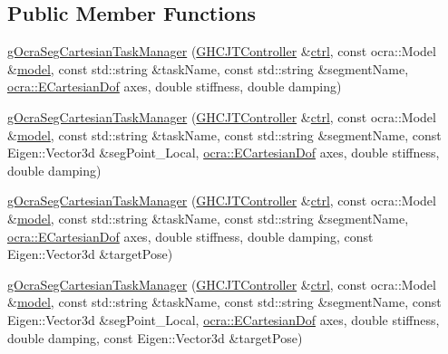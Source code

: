 \subsection*{Public Member Functions}
\begin{DoxyCompactItemize}
\item 
\hyperlink{classgocra_1_1gOcraSegCartesianTaskManager_adea9d716dfc3751b4ce088e8f5617fcd}{g\+Ocra\+Seg\+Cartesian\+Task\+Manager} (\hyperlink{classgocra_1_1GHCJTController}{G\+H\+C\+J\+T\+Controller} \&\hyperlink{classgocra_1_1gOcraTaskManagerBase_a52d76d9b54d92f3d31faeaafda99e4c7}{ctrl}, const ocra\+::\+Model \&\hyperlink{classgocra_1_1gOcraTaskManagerBase_adc439e7170f7120611fc6d009d06404e}{model}, const std\+::string \&task\+Name, const std\+::string \&segment\+Name, \hyperlink{namespaceocra_a436781c7059a0f76027df1c652126260}{ocra\+::\+E\+Cartesian\+Dof} axes, double stiffness, double damping)
\item 
\hyperlink{classgocra_1_1gOcraSegCartesianTaskManager_a33e6727a735de2c8564442f0cb5a3976}{g\+Ocra\+Seg\+Cartesian\+Task\+Manager} (\hyperlink{classgocra_1_1GHCJTController}{G\+H\+C\+J\+T\+Controller} \&\hyperlink{classgocra_1_1gOcraTaskManagerBase_a52d76d9b54d92f3d31faeaafda99e4c7}{ctrl}, const ocra\+::\+Model \&\hyperlink{classgocra_1_1gOcraTaskManagerBase_adc439e7170f7120611fc6d009d06404e}{model}, const std\+::string \&task\+Name, const std\+::string \&segment\+Name, const Eigen\+::\+Vector3d \&seg\+Point\+\_\+\+Local, \hyperlink{namespaceocra_a436781c7059a0f76027df1c652126260}{ocra\+::\+E\+Cartesian\+Dof} axes, double stiffness, double damping)
\item 
\hyperlink{classgocra_1_1gOcraSegCartesianTaskManager_ad67e87ee2d9ee4337bbe322f3bc34e19}{g\+Ocra\+Seg\+Cartesian\+Task\+Manager} (\hyperlink{classgocra_1_1GHCJTController}{G\+H\+C\+J\+T\+Controller} \&\hyperlink{classgocra_1_1gOcraTaskManagerBase_a52d76d9b54d92f3d31faeaafda99e4c7}{ctrl}, const ocra\+::\+Model \&\hyperlink{classgocra_1_1gOcraTaskManagerBase_adc439e7170f7120611fc6d009d06404e}{model}, const std\+::string \&task\+Name, const std\+::string \&segment\+Name, \hyperlink{namespaceocra_a436781c7059a0f76027df1c652126260}{ocra\+::\+E\+Cartesian\+Dof} axes, double stiffness, double damping, const Eigen\+::\+Vector3d \&target\+Pose)
\item 
\hyperlink{classgocra_1_1gOcraSegCartesianTaskManager_a14780eadde3c5c3c9d3d92b011e0003b}{g\+Ocra\+Seg\+Cartesian\+Task\+Manager} (\hyperlink{classgocra_1_1GHCJTController}{G\+H\+C\+J\+T\+Controller} \&\hyperlink{classgocra_1_1gOcraTaskManagerBase_a52d76d9b54d92f3d31faeaafda99e4c7}{ctrl}, const ocra\+::\+Model \&\hyperlink{classgocra_1_1gOcraTaskManagerBase_adc439e7170f7120611fc6d009d06404e}{model}, const std\+::string \&task\+Name, const std\+::string \&segment\+Name, const Eigen\+::\+Vector3d \&seg\+Point\+\_\+\+Local, \hyperlink{namespaceocra_a436781c7059a0f76027df1c652126260}{ocra\+::\+E\+Cartesian\+Dof} axes, double stiffness, double damping, const Eigen\+::\+Vector3d \&target\+Pose)

\end{DoxyCompactItemize}
